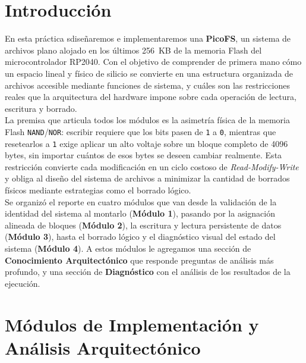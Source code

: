 \documentclass[12pt,letterpaper]{article}
\begin{document}


\newpage

\section*{Introducción}
En esta práctica sdiseñaremos e implementaremos una \textbf{PicoFS}, un sistema de archivos plano alojado en los
últimos 256~KB de la memoria Flash del microcontrolador RP2040. Con el objetivo de comprender de primera mano
cómo un espacio lineal y físico de silicio se convierte en una estructura organizada de archivos accesible
mediante funciones de sistema, y cuáles son las restricciones reales que la arquitectura del hardware impone
sobre cada operación de lectura, escritura y borrado.\\

La premisa que articula todos los módulos es la asimetría física de la memoria Flash \texttt{NAND}/\texttt{NOR}:
escribir requiere que los bits pasen de \texttt{1} a \texttt{0}, mientras que resetearlos a \texttt{1} exige
aplicar un alto voltaje sobre un bloque completo de 4096 bytes, sin importar cuántos de esos bytes se deseen
cambiar realmente. Esta restricción convierte cada modificación en un ciclo costoso de \textit{Read-Modify-Write}
y obliga al diseño del sistema de archivos a minimizar la cantidad de borrados físicos mediante estrategias como
el borrado lógico.\\

Se organizó el reporte en cuatro módulos que van desde la validación de la identidad del sistema al montarlo
(\textbf{Módulo 1}), pasando por la asignación alineada de bloques (\textbf{Módulo 2}), la escritura y lectura
persistente de datos (\textbf{Módulo 3}), hasta el borrado lógico y el diagnóstico visual del estado del sistema
(\textbf{Módulo 4}). A estos módulos le agregamos una sección de \textbf{Conocimiento Arquitectónico} que
responde preguntas de análisis más profundo, y una sección de \textbf{Diagnóstico} con el análisis de los
resultados de la ejecución.

\newpage

\section*{Módulos de Implementación y Análisis Arquitectónico}
\end{document}
